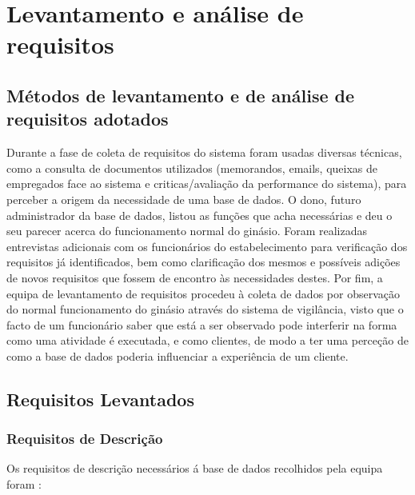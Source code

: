 \chapter{Levantamento e análise de requisitos}

\section{Métodos de levantamento e de análise de requisitos adotados}

Durante a fase de coleta de requisitos do sistema foram usadas diversas técnicas, como a consulta de documentos utilizados (memorandos, emails, queixas de empregados face ao sistema e criticas/avaliação da performance do sistema), para perceber a origem da necessidade de uma base de dados. O dono, futuro administrador da base de dados, listou as funções que acha necessárias e deu o seu parecer acerca do funcionamento normal do ginásio. Foram realizadas entrevistas adicionais com os funcionários do estabelecimento para verificação dos requisitos já identificados, bem como clarificação dos mesmos e possíveis adições de novos requisitos que fossem de encontro às necessidades destes. Por fim, a equipa de levantamento de requisitos procedeu à coleta de dados por observação do normal funcionamento do ginásio através do sistema de vigilância, visto que o facto de um funcionário saber que está a ser observado pode interferir na forma como uma atividade é executada, e como clientes, de modo a ter uma perceção de como a base de dados poderia influenciar a experiência de um cliente.


\section{Requisitos Levantados}

\subsection{Requisitos de Descrição}

Os requisitos de descrição necessários á base de dados recolhidos pela equipa foram :

